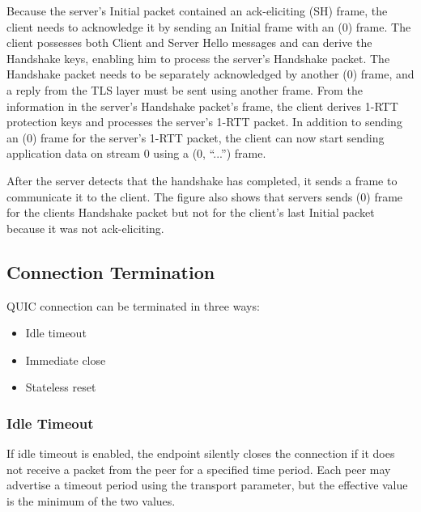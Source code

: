 Because the server's Initial packet contained an ack-eliciting \CRYPTO{}(SH) frame, the client needs
to acknowledge it by sending an Initial frame with an \ACK{}(0) frame. The client possesses both
Client and Server Hello messages and can derive the Handshake keys, enabling him to process the
server's Handshake packet. The Handshake packet needs to be separately acknowledged by another
\ACK{}(0) frame, and a reply from the TLS layer must be sent using another \CRYPTO{} frame. From the
information in the server's Handshake packet's \CRYPTO{} frame, the client derives 1-RTT protection
keys and processes the server's 1-RTT packet. In addition to sending an \ACK{}(0) frame for the
server's 1-RTT packet, the client can now start sending application data on stream 0 using a
\STREAM{}(0, ``...'') frame.

After the server detects that the handshake has completed, it sends a \HANDSHAKEDONE{} frame to
communicate it to the client. The figure also shows that servers sends \ACK{}(0) frame for the
clients Handshake packet but not for the client's last Initial packet because it was not
ack-eliciting.

\subsection{Connection Termination}

QUIC connection can be terminated in three ways:

\begin{itemize}

  \item Idle timeout

  \item Immediate close

  \item Stateless reset

\end{itemize}

\subsubsection{Idle Timeout}\label{sec:02-idle-timeout}

If idle timeout is enabled, the endpoint silently closes the connection if it does not receive a
packet from the peer for a specified time period. Each peer may advertise a timeout period using the
\MaxIdleTimeout{} transport parameter, but the effective value is the minimum of the two values.

